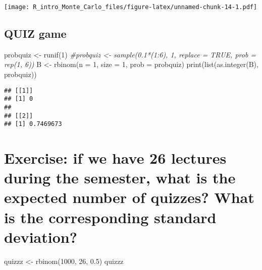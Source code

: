 \documentclass[
]{article}
\newenvironment{Shaded}{\begin{snugshade}}{\end{snugshade}}
\newcommand{\AttributeTok}[1]{\textcolor[rgb]{0.77,0.63,0.00}{#1}}
\newcommand{\CommentTok}[1]{\textcolor[rgb]{0.56,0.35,0.01}{\textit{#1}}}
\newcommand{\DecValTok}[1]{\textcolor[rgb]{0.00,0.00,0.81}{#1}}
\newcommand{\FloatTok}[1]{\textcolor[rgb]{0.00,0.00,0.81}{#1}}
\newcommand{\FunctionTok}[1]{\textcolor[rgb]{0.00,0.00,0.00}{#1}}
\newcommand{\NormalTok}[1]{#1}
\newcommand{\OtherTok}[1]{\textcolor[rgb]{0.56,0.35,0.01}{#1}}
\begin{document}
\texttt{[image: R\_intro\_Monte\_Carlo\_files/figure-latex/unnamed-chunk-14-1.pdf]}

\hypertarget{quiz-game}{%
\subsection{QUIZ game}\label{quiz-game}}

\begin{Shaded}
\begin{Highlighting}[]
\NormalTok{probquiz }\OtherTok{\textless{}{-}} \FunctionTok{runif}\NormalTok{(}\DecValTok{1}\NormalTok{)}
\CommentTok{\#probquiz \textless{}{-} sample(0.1*(1:6), 1, replace = TRUE, prob = rep(1, 6))}
\NormalTok{B }\OtherTok{\textless{}{-}} \FunctionTok{rbinom}\NormalTok{(}\AttributeTok{n =} \DecValTok{1}\NormalTok{, }\AttributeTok{size =} \DecValTok{1}\NormalTok{, }\AttributeTok{prob =}\NormalTok{ probquiz)}
\FunctionTok{print}\NormalTok{(}\FunctionTok{list}\NormalTok{(}\FunctionTok{as.integer}\NormalTok{(B), probquiz))}
\end{Highlighting}
\end{Shaded}

\begin{verbatim}
## [[1]]
## [1] 0
## 
## [[2]]
## [1] 0.7469673
\end{verbatim}

\hypertarget{exercise-if-we-have-26-lectures-during-the-semester-what-is-the-expected-number-of-quizzes-what-is-the-corresponding-standard-deviation}{%
\section{Exercise: if we have 26 lectures during the semester, what is
the expected number of quizzes? What is the corresponding standard
deviation?}\label{exercise-if-we-have-26-lectures-during-the-semester-what-is-the-expected-number-of-quizzes-what-is-the-corresponding-standard-deviation}}

\begin{Shaded}
\begin{Highlighting}[]
\NormalTok{quizzz }\OtherTok{\textless{}{-}} \FunctionTok{rbinom}\NormalTok{(}\DecValTok{1000}\NormalTok{, }\DecValTok{26}\NormalTok{, }\FloatTok{0.5}\NormalTok{)}
\NormalTok{quizzz}
\end{Highlighting}
\end{Shaded}
\end{document}
